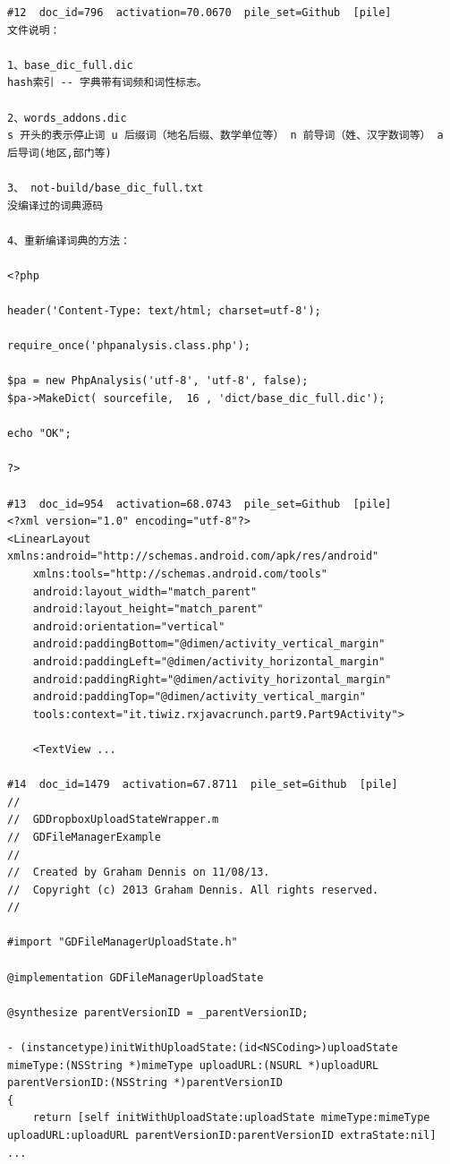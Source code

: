 \begin{verbatim}
#12  doc_id=796  activation=70.0670  pile_set=Github  [pile]
﻿文件说明：

1、base_dic_full.dic
hash索引 -- 字典带有词频和词性标志。

2、words_addons.dic
s 开头的表示停止词 u 后缀词（地名后缀、数学单位等） n 前导词（姓、汉字数词等） a 后导词(地区,部门等)

3、 not-build/base_dic_full.txt
没编译过的词典源码

4、重新编译词典的方法：

<?php

header('Content-Type: text/html; charset=utf-8');

require_once('phpanalysis.class.php');

$pa = new PhpAnalysis('utf-8', 'utf-8', false);
$pa->MakeDict( sourcefile,  16 , 'dict/base_dic_full.dic');

echo "OK";

?>

#13  doc_id=954  activation=68.0743  pile_set=Github  [pile]
<?xml version="1.0" encoding="utf-8"?>
<LinearLayout xmlns:android="http://schemas.android.com/apk/res/android"
    xmlns:tools="http://schemas.android.com/tools"
    android:layout_width="match_parent"
    android:layout_height="match_parent"
    android:orientation="vertical"
    android:paddingBottom="@dimen/activity_vertical_margin"
    android:paddingLeft="@dimen/activity_horizontal_margin"
    android:paddingRight="@dimen/activity_horizontal_margin"
    android:paddingTop="@dimen/activity_vertical_margin"
    tools:context="it.tiwiz.rxjavacrunch.part9.Part9Activity">

    <TextView ...

#14  doc_id=1479  activation=67.8711  pile_set=Github  [pile]
//
//  GDDropboxUploadStateWrapper.m
//  GDFileManagerExample
//
//  Created by Graham Dennis on 11/08/13.
//  Copyright (c) 2013 Graham Dennis. All rights reserved.
//

#import "GDFileManagerUploadState.h"

@implementation GDFileManagerUploadState

@synthesize parentVersionID = _parentVersionID;

- (instancetype)initWithUploadState:(id<NSCoding>)uploadState mimeType:(NSString *)mimeType uploadURL:(NSURL *)uploadURL parentVersionID:(NSString *)parentVersionID
{
    return [self initWithUploadState:uploadState mimeType:mimeType uploadURL:uploadURL parentVersionID:parentVersionID extraState:nil] ...


\end{verbatim}
